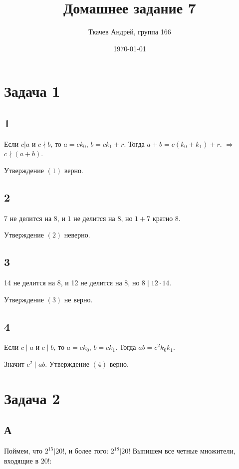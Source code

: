 \documentclass{article}
\title{Домашнее задание 7}
\author{Ткачев Андрей, группа 166}
\date{\today}
\begin{document}
	\maketitle
	
	\section{Задача 1}
	
	\subsection{1}
	
	 Если $c|a$ и $c\nmid b$, то $a = ck_0$, $b = ck_1 + r$. Тогда $a + b = c(k_0 + k_1) + r$. $\Rightarrow$ $c \nmid (a + b)$.
	 
	 Утверждение $(1)$ верно.
	
	\subsection{2}
	
	$ 7 $ не делится на $ 8 $, и $ 1 $ не делится на $ 8 $, но $ 1 + 7 $ кратно $ 8 $.
	
	Утверждение $(2)$ неверно.
	
	\subsection{3}
	
	14 не делится на 8, и 12 не делится на 8, но $8 \mid 12 \cdot 14$.
	
	Утверждение $(3)$ не верно.
	
	\subsection{4}
	
	Если $c\mid a$ и $c\mid b$, то $a = ck_0$, $b = ck_1$. Тогда
	$ab = c^2k_0k_1$.
	
	Значит $c^2\mid ab$. Утверждение $(4)$ верно.
	
	\section{Задача 2}
	
	\subsection{А}

	Поймем, что $2^{15} | 20!$, и более того: $2^{18} | 20!$ Выпишем все четные множители, входящие в $20!$:
	
\end{document}
